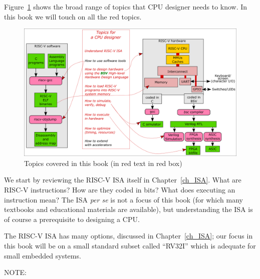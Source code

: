 Figure~\ref{Fig_Topics} shows the broad range of topics that CPU
designer needs to know.  In this book we will touch on all the red
topics.
\begin{figure}[htbp]
  \centerline{\includegraphics[width=6in,angle=0]{Figures/Fig_Topics}}
  \caption{\label{Fig_Topics}Topics covered in this book (in red text in red box)}
\end{figure}

We start by reviewing the RISC-V ISA itself in Chapter~\ref{ch_ISA}.
What are RISC-V instructions? How are they coded in bits? What does
executing an instruction mean?  The ISA \emph{per se} is not a focus
of this book (for which many textbooks and educational materials are
available), but understanding the ISA is of course a prerequisite to
designing a CPU.

The RISC-V ISA has many options, discussed in Chapter~\ref{ch_ISA};
our focus in this book will be on a small standard subset called
``RV32I'' which is adequate for small embedded systems.


\vspace{1ex}

NOTE: 


